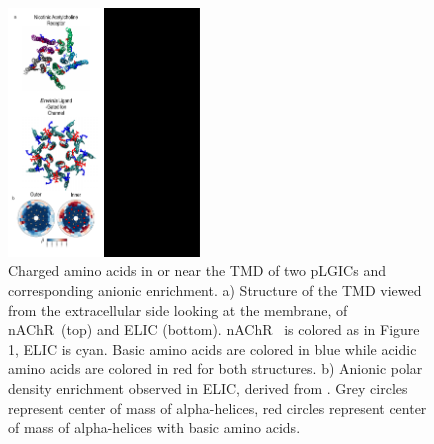 \documentclass[9pt]{article}
\newcommand{\nachr}{nAChR}
\newcommand{\plgic}{pLGIC}
\begin{document}
\renewcommand{\thefigure}{SI 2}

\begin{figure}
	\center
	\includegraphics[width=2in]{../Figures/Anonic_AA.pdf}
	\caption{Charged amino acids in or near the TMD of two \plgic s and corresponding anionic enrichment. a) Structure of the TMD viewed from the extracellular side looking at the membrane, of \nachr~(top)\cite{Unwin2005} and ELIC\cite{Pan2012} (bottom). \nachr~ is colored as in Figure 1, ELIC is cyan. Basic amino acids are colored in blue while acidic amino acids are colored in red for both structures. b) Anionic polar density enrichment observed in ELIC, derived from \cite{Tong2019}. Grey circles represent center of mass of alpha-helices, red circles represent center of mass of alpha-helices with basic amino acids. }
	\label{fig:aaa}
\end{figure}
\renewcommand{\thetable}{SI 2}
\end{document}
